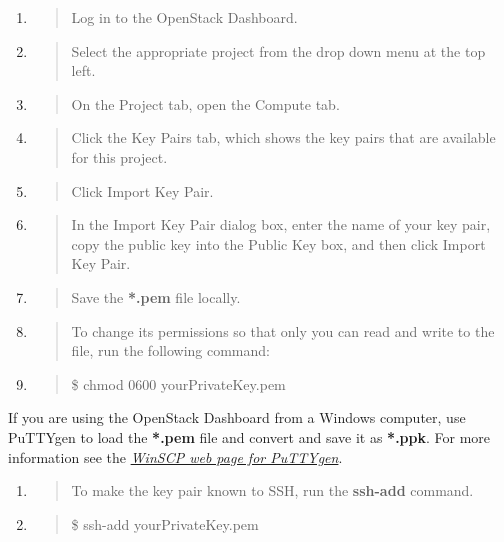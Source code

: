 {\begin{enumerate}
\def\labelenumi{\arabic{enumi}.}
\item
  \begin{quote}
  Log in to the \gls{OpenStack Dashboard}.
  \end{quote}
\item
  \begin{quote}
  Select the appropriate project from the drop down menu at the top
  left.
  \end{quote}
\item
  \begin{quote}
  On the Project tab, open the Compute tab.
  \end{quote}
\item
  \begin{quote}
  Click the Key Pairs tab, which shows the key pairs that are available
  for this project.
  \end{quote}
\item
  \begin{quote}
  Click Import Key Pair.
  \end{quote}
\item
  \begin{quote}
  In the Import Key Pair dialog box, enter the name of your key pair,
  copy the public key into the Public Key box, and then click Import Key
  Pair.
  \end{quote}
\item
  \begin{quote}
  Save the \textbf{*.pem} file locally.
  \end{quote}
\item
  \begin{quote}
  To change its permissions so that only you can read and write to the
  file, run the following command:
  \end{quote}
\item
  \begin{quote}
  \$ chmod 0600 yourPrivateKey.pem
  \end{quote}
\end{enumerate}

 If you are using the \gls{OpenStack Dashboard} from a
Windows computer, use PuTTYgen to load the \textbf{*.pem} file and
convert and save it as \textbf{*.ppk}.  For more information see the
\href{https://winscp.net/eng/docs/ui_puttygen}{\emph{WinSCP web page
    for PuTTYgen}}.

\begin{enumerate}
\def\labelenumi{\arabic{enumi}.}
\item
  \begin{quote}
  To make the key pair known to SSH, run the \textbf{ssh-add} command.
  \end{quote}
\item
  \begin{quote}
  \$ ssh-add yourPrivateKey.pem
  \end{quote}
\end{enumerate}

}
